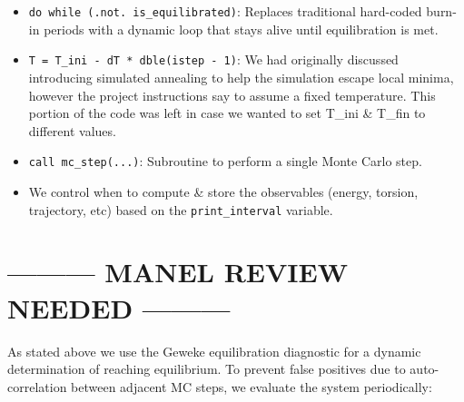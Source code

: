 \begin{itemize}
\tightlist
\item
  \texttt{do\ while\ (.not.\ is\_equilibrated)}: Replaces traditional
  hard-coded burn-in periods with a dynamic loop that stays alive until
  equilibration is met.
\item
  \texttt{T\ =\ T\_ini\ -\ dT\ *\ dble(istep\ -\ 1)}: We had originally
  discussed introducing simulated annealing to help the simulation
  escape local minima, however the project instructions say to assume a
  fixed temperature. This portion of the code was left in case we wanted
  to set T\_ini \& T\_fin to different values.
\item
  \texttt{call\ mc\_step(...)}: Subroutine to perform a single Monte
  Carlo step.
\item
  We control when to compute \& store the observables (energy, torsion,
  trajectory, etc) based on the \texttt{print\_interval} variable.
\end{itemize}

\section{--------- MANEL REVIEW NEEDED
---------}\label{manel-review-needed}

As stated above we use the Geweke equilibration diagnostic for a dynamic
determination of reaching equilibrium. To prevent false positives due to
auto-correlation between adjacent MC steps, we evaluate the system
periodically:

\begin{Shaded}
\begin{Highlighting}[]
    \NormalTok{ (}\OperatorTok{==} \NormalTok{) }
      
\KeywordTok{=}\KeywordTok{+} 
      \OperatorTok{\textless{}=}
\KeywordTok{=}
\KeywordTok{=}
      
      \OperatorTok{\textgreater{}=} \OperatorTok{==} \NormalTok{) }
        \OperatorTok{\textless{}}
\KeywordTok{=} 
\end{Highlighting}
\end{Shaded}


